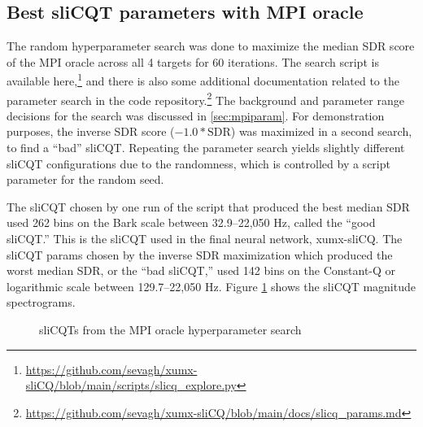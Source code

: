 \documentclass[report.tex]{subfiles}
\begin{document}
\newpagefill

\subsection{Best sliCQT parameters with MPI oracle}

The random hyperparameter search was done to maximize the median SDR score of the MPI oracle across all 4 targets for 60 iterations. The search script is available here,\footnote{\url{https://github.com/sevagh/xumx-sliCQ/blob/main/scripts/slicq_explore.py}} and there is also some additional documentation related to the parameter search in the code repository.\footnote{\url{https://github.com/sevagh/xumx-sliCQ/blob/main/docs/slicq_params.md}} The background and parameter range decisions for the search was discussed in \ref{sec:mpiparam}. For demonstration purposes, the inverse SDR score ($-1.0*\text{SDR}$) was maximized in a second search, to find a ``bad'' sliCQT. Repeating the parameter search yields slightly different sliCQT configurations due to the randomness, which is controlled by a script parameter for the random seed.

The sliCQT chosen by one run of the script that produced the best median SDR used 262 bins on the Bark scale between 32.9--22,050 Hz, called the ``good sliCQT.'' This is the sliCQT used in the final neural network, xumx-sliCQ. The sliCQT params chosen by the inverse SDR maximization which produced the worst median SDR, or the ``bad sliCQT,'' used 142 bins on the Constant-Q or logarithmic scale between 129.7--22,050 Hz. Figure \ref{fig:bipolarslicqs} shows the sliCQT magnitude spectrograms.

\begin{figure}[ht]
	\centering
	\hspace{0.1em}
	\caption{sliCQTs from the MPI oracle hyperparameter search}
	\label{fig:bipolarslicqs}
\end{figure}
\end{document}
